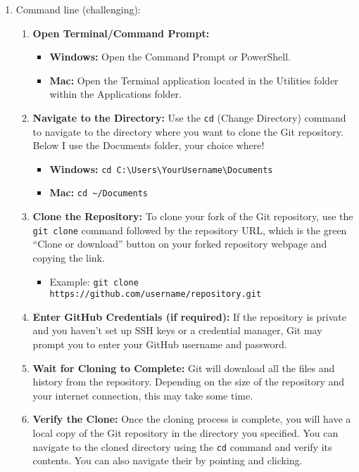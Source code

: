 \documentclass[12pt,english]{exam}
\begin{document}
\begin{questions}
\begin{enumerate}
  \item Command line (challenging):
  \begin{enumerate}
    \item \textbf{Open Terminal/Command Prompt:}
      \begin{itemize}
        \item \textbf{Windows:} Open the Command Prompt or PowerShell.
        \item \textbf{Mac:} Open the Terminal application located in the Utilities folder within the Applications folder.
      \end{itemize}
  \item \textbf{Navigate to the Directory:}
      Use the \texttt{cd} (Change Directory) command to navigate to the directory where you want to clone the Git repository. Below I use the Documents folder, your choice where! 
      \begin{itemize}
        \item \textbf{Windows:} \texttt{cd C:\textbackslash Users\textbackslash YourUsername\textbackslash Documents}
        \item \textbf{Mac:} \texttt{cd \textasciitilde/Documents}
      \end{itemize}
  \item \textbf{Clone the Repository:}
      To clone your fork of the Git repository, use the \texttt{git clone} command followed by the repository URL, which is the green ``Clone or download'' button on your forked repository webpage and copying the link.
      \begin{itemize}
      \item Example: \texttt{git clone https://github.com/username/repository.git}
      \end{itemize}

  \item \textbf{Enter GitHub Credentials (if required):}
      If the repository is private and you haven't set up SSH keys or a credential manager, Git may prompt you to enter your GitHub username and password.

  \item \textbf{Wait for Cloning to Complete:}
      Git will download all the files and history from the repository. Depending on the size of the repository and your internet connection, this may take some time.

  \item \textbf{Verify the Clone:}
      Once the cloning process is complete, you will have a local copy of the Git repository in the directory you specified. You can navigate to the cloned directory using the \texttt{cd} command and verify its contents. You can also navigate their by pointing and clicking. 
  \end{enumerate}
\end{enumerate}


\end{questions}
\end{document}
